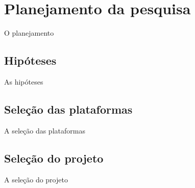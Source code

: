 \begin{comment}
Texto introdutório da seção -> Precisa?
ok - projeto feito com tais condicoes de equipe, tempo e equipamento
ok - agora vai ser feito com tais nova condicoes de equipe, tempo e equipamento
ok - pouco conhecimento em html, css e javascript
pq o uso do mini farma, pq o código eh nosso, app pequeno, mas que usa varios recursos nativos do celular
pq o uso do ionic e nao de outra, criterios de escolha
será que aqui fala das versoes do ios, ionic, cordova, angularjs? sim e explicar pq nao escolheu a versao 2 do ionic, pq eh recente e estavel
\end{comment}

\section{Planejamento da pesquisa} \label{sec:planejamento}

O planejamento

\subsection{Hipóteses} \label{subsec:hipoteses}

As hipóteses

\subsection{Seleção das plataformas} \label{subsec:selecaodasplataformas}

A seleção das plataformas

\subsection{Seleção do projeto} \label{subsec:selecaodoprojeto}

A seleção do projeto